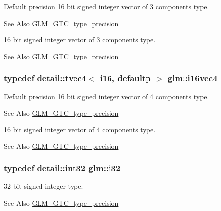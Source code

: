 Default precision 16 bit signed integer vector of 3 components type. \begin{DoxySeeAlso}{See Also}
\hyperlink{group__gtc__type__precision}{G\-L\-M\-\_\-\-G\-T\-C\-\_\-type\-\_\-precision}
\end{DoxySeeAlso}
16 bit signed integer vector of 3 components type. \begin{DoxySeeAlso}{See Also}
\hyperlink{group__gtc__type__precision}{G\-L\-M\-\_\-\-G\-T\-C\-\_\-type\-\_\-precision} 
\end{DoxySeeAlso}
\hypertarget{group__gtc__type__precision_ga28cd96ac55e2209bdbd3a41cb8af970a}{
\subsubsection[{i16vec4}]{\setlength{\rightskip}{0pt plus 5cm}typedef detail\-::tvec4$<$ i16, defaultp $>$ {\bf glm\-::i16vec4}}}\label{group__gtc__type__precision_ga28cd96ac55e2209bdbd3a41cb8af970a}
Default precision 16 bit signed integer vector of 4 components type. \begin{DoxySeeAlso}{See Also}
\hyperlink{group__gtc__type__precision}{G\-L\-M\-\_\-\-G\-T\-C\-\_\-type\-\_\-precision}
\end{DoxySeeAlso}
16 bit signed integer vector of 4 components type. \begin{DoxySeeAlso}{See Also}
\hyperlink{group__gtc__type__precision}{G\-L\-M\-\_\-\-G\-T\-C\-\_\-type\-\_\-precision} 
\end{DoxySeeAlso}
\hypertarget{group__gtc__type__precision_ga1d8ed5c43e91ea7d4528389da4fa9524}{
\subsubsection[{i32}]{\setlength{\rightskip}{0pt plus 5cm}typedef detail\-::int32 {\bf glm\-::i32}}}\label{group__gtc__type__precision_ga1d8ed5c43e91ea7d4528389da4fa9524}
32 bit signed integer type. \begin{DoxySeeAlso}{See Also}
\hyperlink{group__gtc__type__precision}{G\-L\-M\-\_\-\-G\-T\-C\-\_\-type\-\_\-precision} 
\end{DoxySeeAlso}
